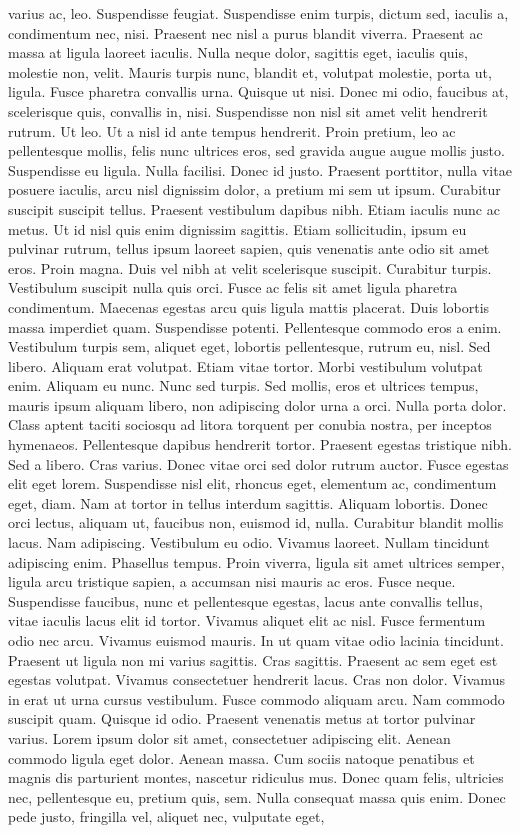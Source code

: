 varius ac, leo. Suspendisse feugiat. Suspendisse enim turpis, dictum sed, iaculis a, condimentum nec, nisi. Praesent nec nisl a purus blandit viverra. Praesent ac massa at ligula laoreet iaculis. Nulla neque dolor, sagittis eget, iaculis quis, molestie non, velit. Mauris turpis nunc, blandit et, volutpat molestie, porta ut, ligula. Fusce pharetra convallis urna. Quisque ut nisi. Donec mi odio, faucibus at, scelerisque quis, convallis in, nisi. Suspendisse non nisl sit amet velit hendrerit rutrum. Ut leo. Ut a nisl id ante tempus hendrerit. Proin pretium, leo ac pellentesque mollis, felis nunc ultrices eros, sed gravida augue augue mollis justo. Suspendisse eu ligula. Nulla facilisi. Donec id justo. Praesent porttitor, nulla vitae posuere iaculis, arcu nisl dignissim dolor, a pretium mi sem ut ipsum. Curabitur suscipit suscipit tellus. Praesent vestibulum dapibus nibh. Etiam iaculis nunc ac metus. Ut id nisl quis enim dignissim sagittis. Etiam sollicitudin, ipsum eu pulvinar rutrum, tellus ipsum laoreet sapien, quis venenatis ante odio sit amet eros. Proin magna. Duis vel nibh at velit scelerisque suscipit. Curabitur turpis. Vestibulum suscipit nulla quis orci. Fusce ac felis sit amet ligula pharetra condimentum. Maecenas egestas arcu quis ligula mattis placerat. Duis lobortis massa imperdiet quam. Suspendisse potenti. Pellentesque commodo eros a enim. Vestibulum turpis sem, aliquet eget, lobortis pellentesque, rutrum eu, nisl. Sed libero. Aliquam erat volutpat. Etiam vitae tortor. Morbi vestibulum volutpat enim. Aliquam eu nunc. Nunc sed turpis. Sed mollis, eros et ultrices tempus, mauris ipsum aliquam libero, non adipiscing dolor urna a orci. Nulla porta dolor. Class aptent taciti sociosqu ad litora torquent per conubia nostra, per inceptos hymenaeos. Pellentesque dapibus hendrerit tortor. Praesent egestas tristique nibh. Sed a libero. Cras varius. Donec vitae orci sed dolor rutrum auctor. Fusce egestas elit eget lorem. Suspendisse nisl elit, rhoncus eget, elementum ac, condimentum eget, diam. Nam at tortor in tellus interdum sagittis. Aliquam lobortis. Donec orci lectus, aliquam ut, faucibus non, euismod id, nulla. Curabitur blandit mollis lacus. Nam adipiscing. Vestibulum eu odio. Vivamus laoreet. Nullam tincidunt adipiscing enim. Phasellus tempus. Proin viverra, ligula sit amet ultrices semper, ligula arcu tristique sapien, a accumsan nisi mauris ac eros. Fusce neque. Suspendisse faucibus, nunc et pellentesque egestas, lacus ante convallis tellus, vitae iaculis lacus elit id tortor. Vivamus aliquet elit ac nisl. Fusce fermentum odio nec arcu. Vivamus euismod mauris. In ut quam vitae odio lacinia tincidunt. Praesent ut ligula non mi varius sagittis. Cras sagittis. Praesent ac sem eget est egestas volutpat. Vivamus consectetuer hendrerit lacus. Cras non dolor. Vivamus in erat ut urna cursus vestibulum. Fusce commodo aliquam arcu. Nam commodo suscipit quam. Quisque id odio. Praesent venenatis metus at tortor pulvinar varius. Lorem ipsum dolor sit amet, consectetuer adipiscing elit. Aenean commodo ligula eget dolor. Aenean massa. Cum sociis natoque penatibus et magnis dis parturient montes, nascetur ridiculus mus. Donec quam felis, ultricies nec, pellentesque eu, pretium quis, sem. Nulla consequat massa quis enim. Donec pede justo, fringilla vel, aliquet nec, vulputate eget, 